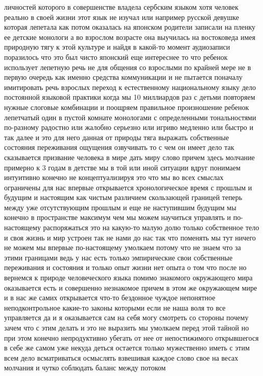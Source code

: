 личностей которого в совершенстве владела сербским языком хотя человек реально в
своей жизни этот язык не изучал или например русской девушке которая лепетала
как потом оказалась на японском родители записали на пленку ее детские монологи
а во взрослом возрасте она выучилась на востоковеда имея природную тягу к этой
культуре и найдя в какой-то момент аудиозаписи поразилось что это был чисто
японский еще интереснее то что ребенок использует лепетную речь не для общения
со взрослыми по крайней мере не в первую очередь как именно средства
коммуникации и не пытается поначалу имитировать речь взрослых переход к
естественному национальному языку дело постоянной языковой практики когда мы 10
миллиардов раз с детьми повторяем нужные слоговые комбинации и поощряем
правильное произношение ребенок лепетчатый один в пустой комнате монологами с
определенными тональностями по-разному радостно или жалобно серьезно или игриво
медленно или быстро и так далее и это для него данная от природы тяга выражать
собственные состояния переживания ощущения озвучивать то с чем он имеет дело так
сказывается призвание человека в мире дать миру слово причем здесь молчание
примерно к 3 годам в детстве мы в той или иной ситуации вдруг понимаем
интуитивно конечно не концептуализируя это что мы во всех смыслах ограничены для
нас впервые открывается хронологическое время с прошлым и будущим и настоящим
как чистым различием скользающей границей теперь между уже отсутствующим прошлым
и еще не наступившим будущим мы конечно в пространстве максимум чем мы можем
научиться управлять и по-настоящему распоряжаться это на какую-то малую долю
только собственное тело и своя жизнь и мир устроен так не нами до нас так что
поменять мы тут ничего не можем мы впервые по-настоящему умолкаем потому что не
знаем что за этими границами ведь у нас есть только эмпирические свои
собственные переживания и состояния и только опыт жизни нет опыта о том что
после но вернемся к природе человеческого языка помимо знакомого окружающего
мира оказывается есть и совершенно незнакомое причем в этом же окружающем мире и
в нас же самих открывается что-то бездонное чуждое непонятное неподконтрольное
какие-то законы которыми если не наша воля то все управляется да и я оказывается
сам на себя могу смотреть со стороны почему зачем что с этим делать и это не
выразить мы умолкаем перед этой тайной но при этом конечно непродуктивно убегать
от нее от непостижимого открывшегося в себе же самом уже некуда деться остается
только мужественно иметь с этим всем дело всматриваться осмыслять взвешивая
каждое слово свое на весах молчания и чутко соблюдать баланс между потоком
